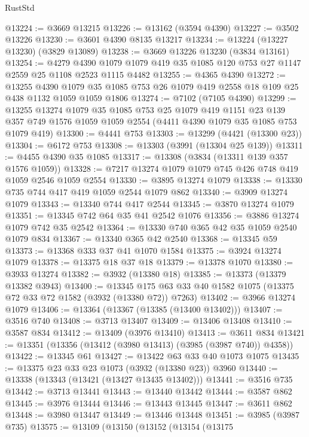 \begin{lexlean}{RustStd}
\begin{coremodule}
@13224 := @3669 @13215
@13226 := @13162 (@3594 @4390)
@13227 := @3502 @13226
@13230 := @3601 @4390 @8135 @13217
@13234 := @13224 (@13227 @13230) (@3829 @13089)
@13238 := @3669 @13226 @13230 (@3834 @13161)
@13254 := @4279
    @4390
    @1079
    @1079
    @419
    @35
    @1085
    @120
    @753
    @27
    @1147
    @2559
    @25
    @1108
    @2523
    @1115
    @4482
@13255 := @4365 @4390
@13272 := @13255
    @4390
    @1079
    @35
    @1085
    @753
    @26
    @1079
    @419
    @2558
    @18
    @109
    @25
    @438
    @1132
    @1059
    @1059
    @1806
@13274 := @7102 (@7105 @4390)
@13299 := @13255
    @13274
    @1079
    @35
    @1085
    @753
    @25
    @1079
    @419
    @1151
    @23
    @139
    @357
    @749
    @1576
    @1059
    @1059
    @2554
    (@4411 @4390 @1079 @35 @1085 @753 @1079 @419)
@13300 := @4441 @753
@13303 := @13299 (@4421 (@13300 @23))
@13304 := @6172 @753
@13308 := @13303 (@3991 (@13304 @25 @139))
@13311 := @4455 @4390 @35 @1085
@13317 := @13308 (@3834 (@13311 @139 @357 @1576 @1059))
@13328 := @7217 @13274 @1079 @1079 @745 @426 @748 @419 @1059 @2546 @1059 @2554
@13330 := @3895 @13274 @1079
@13338 := @13330 @735 @744 @417 @419 @1059 @2544 @1079 @862
@13340 := @3909 @13274 @1079
@13343 := @13340 @744 @417 @2544
@13345 := @3870 @13274 @1079
@13351 := @13345 @742 @64 @35 @41 @2542 @1076
@13356 := @3886 @13274 @1079 @742 @35 @2542
@13364 := @13330 @740 @365 @42 @35 @1059 @2540 @1079 @834
@13367 := @13340 @365 @42 @2540
@13368 := @13345 @59
@13373 := @13368 @333 @37 @41 @1070 @1584
@13375 := @3924 @13274 @1079
@13378 := @13375 @18 @37 @18
@13379 := @13378 @1070
@13380 := @3933 @13274
@13382 := @3932 (@13380 @18)
@13385 := @13373 (@13379 @13382 @3943)
@13400 := @13345 @175 @63 @33 @40 @1582 @1075 (@13375 @72 @33 @72 @1582 (@3932 (@13380 @72)) @7263)
@13402 := @3966 @13274 @1079
@13406 := @13364 (@13367 (@13385 (@13400 @13402)))
@13407 := @3516 @740
@13408 := @3713 @13407
@13409 := @13406 @13408
@13410 := @3587 @834
@13412 := @13409 (@3976 @13410)
@13413 := @3611 @834
@13421 := @13351 (@13356 (@13412 (@3980 @13413) (@3985 (@3987 @740)) @4358))
@13422 := @13345 @61
@13427 := @13422 @63 @33 @40 @1073 @1075
@13435 := @13375 @23 @33 @23 @1073 (@3932 (@13380 @23)) @3960
@13440 := @13338 (@13343 (@13421 (@13427 @13435 @13402)))
@13441 := @3516 @735
@13442 := @3713 @13441
@13443 := @13440 @13442
@13444 := @3587 @862
@13445 := @3976 @13444
@13446 := @13443 @13445
@13447 := @3611 @862
@13448 := @3980 @13447
@13449 := @13446 @13448
@13451 := @3985 (@3987 @735)
@13575 := @13109
    (@13150
      (@13152
        (@13154
          (@13175

\end{coremodule}
\end{lexlean}
